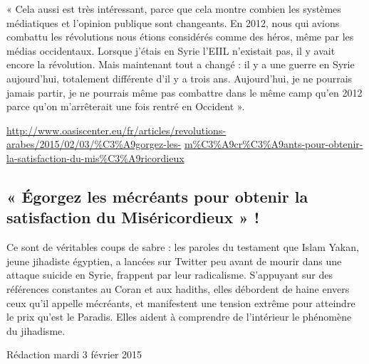« Cela aussi est très intéressant, parce que cela montre combien les
systèmes médiatiques et l'opinion publique sont changeants. En 2012,
nous qui avions combattu les révolutions nous étions considérés comme
des héros, même par les médias occidentaux. Lorsque j'étais en Syrie
l'EIIL n'existait pas, il y avait encore la révolution. Mais maintenant
tout a changé : il y a une guerre en Syrie aujourd'hui, totalement
différente d'il y a trois ans. Aujourd'hui, je ne pourrais jamais
partir, je ne pourrais même pas combattre dans le même camp qu'en 2012
parce qu'on m'arrêterait une fois rentré en Occident ».

\href{http://www.oasiscenter.eu/fr/articles/revolutions-arabes/2015/02/03/\%C3\%A9gorgez-les-}{\underline{http://www.oasiscenter.eu/fr/articles/revolutions-arabes/2015/02/03/\%C3\%A9gorgez-les-}}
\underline{m\%C3\%A9cr\%C3\%A9ants-pour-obtenir-la-satisfaction-du-mis\%C3\%A9ricordieux}

\hypertarget{uxe9gorgez-les-muxe9cruxe9ants-pour-obtenir-la-satisfaction-du-misuxe9ricordieux}{%
\subsection{« Égorgez les mécréants pour obtenir la satisfaction du
Miséricordieux »
!}\label{uxe9gorgez-les-muxe9cruxe9ants-pour-obtenir-la-satisfaction-du-misuxe9ricordieux}}

Ce sont de véritables coups de sabre : les paroles du testament que
Islam Yakan, jeune jihadiste égyptien, a lancées sur Twitter peu avant
de mourir dans une attaque suicide en Syrie, frappent par leur
radicalisme. S'appuyant sur des références constantes au Coran et aux
hadiths, elles débordent de haine envers ceux qu'il appelle mécréants,
et manifestent une tension extrême pour atteindre le prix qu'est le
Paradis. Elles aident à comprendre de l'intérieur le phénomène du
jihadisme.

Rédaction \textbar{} mardi 3 février 2015

